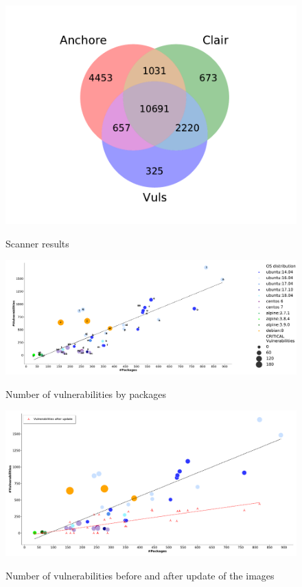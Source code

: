 \documentclass[a4paper,num-refs]{oup-contemporary}
\begin{document}
\begin{figure}
        {\includegraphics[scale=2.5,width=\columnwidth]
        {Figures/venn.pdf}}
        \caption{\label{fig:venn} Scanner results}
\end{figure}

\begin{figure}[t]
	{\includegraphics[scale=1.5,width=\textwidth]
	{Figures/vulngraph.pdf}}
        \caption{\label{fig:graph1} Number of vulnerabilities by packages}
      \end{figure}

\begin{figure}[b]
        {\includegraphics[width=\textwidth]
        {Figures/vulnwithupdate.pdf}}
        \caption{\label{fig:graph2} Number of vulnerabilities before and
        after update of the images}
      \end{figure}
\end{document}
